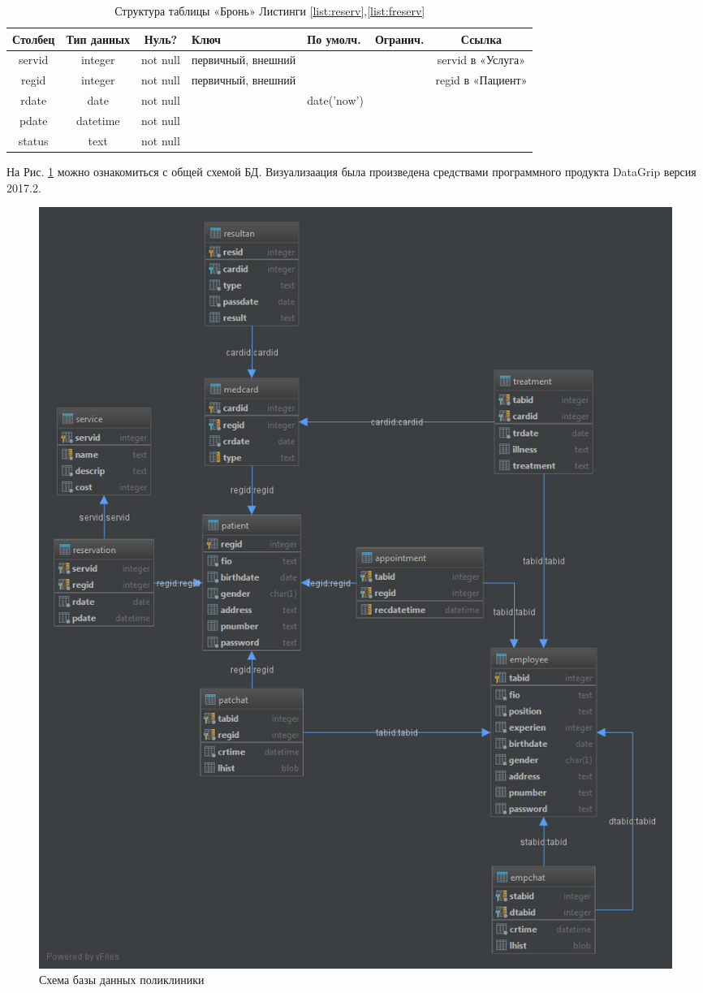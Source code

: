 \documentclass[14pt,a4paper,russian]{extreport}
\begin{document}
\begin{table}[h!]
    \centering
    \begin{tabularx}{\textwidth}{| c | c | c | X | X | c | c |}
        \hline
        \textbf{Столбец} & \textbf{Тип данных} & \textbf{Нуль?} & \textbf{Ключ} & \textbf{По
        умолч.} & \textbf{Огранич.} & \textbf{Ссылка} \\ \hline
        servid & integer & not null & первичный, внешний & & & servid в «Услуга»\\ \hline
        regid & integer & not null & первичный, внешний & & & regid в «Пациент» \\ \hline
        rdate & date & not null & & date('now') & & \\ \hline
        pdate & datetime & not null & & & & \\ \hline
        status & text & not null & & & & \\ \hline
    \end{tabularx}
    \caption{Структура таблицы «Бронь» Листинги \ref{list:reserv},\ref{list:freserv}}
    \label{table:reserv}
\end{table}

\cleardoublepage
На Рис. \ref{fig:clinic} можно ознакомиться с общей схемой БД. Визуализаация была
произведена средствами программного продукта DataGrip версия 2017.2.

\begin{figure}[b!]
        \includegraphics[scale=0.6]{clinic}
        \caption{Схема базы данных поликлиники}
        \label{fig:clinic}
\end{figure}
\end{document}
